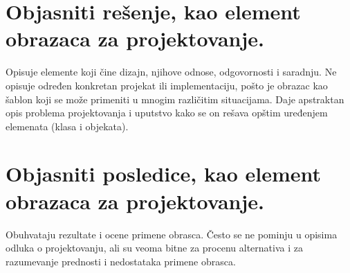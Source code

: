 \documentclass[a4paper]{article}
\begin{document}
\section{Objasniti rešenje, kao element obrazaca za projektovanje.}
  Opisuje elemente koji čine dizajn, njihove odnose, odgovornosti i saradnju.
  Ne opisuje određen konkretan projekat ili implementaciju, 
  pošto je obrazac kao šablon koji se može primeniti u mnogim različitim situacijama.
  Daje apstraktan opis problema projektovanja i uputstvo kako se on rešava opštim uređenjem 
  elemenata (klasa i objekata).

\section{Objasniti posledice, kao element obrazaca za projektovanje.}
  Obuhvataju rezultate i ocene primene obrasca.
  Često se ne pominju u opisima odluka o projektovanju, 
  ali su veoma bitne za procenu alternativa i za razumevanje prednosti 
  i nedostataka primene obrasca.
\end{document}
